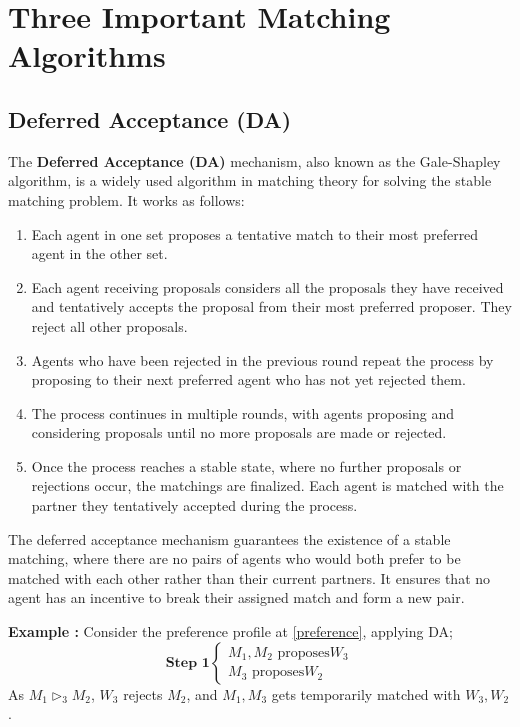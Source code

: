 \documentclass[a4paper,11pt,table]{article}
\newcommand{\rva}{\vartriangleright}
\theoremstyle{definition}
\theoremstyle{remark}
\begin{document}
\section{Three Important Matching Algorithms}

\subsection{Deferred Acceptance (DA)}

   The \textbf{Deferred Acceptance (DA)} mechanism, also known as the Gale-Shapley algorithm, is a widely used algorithm in matching theory for solving the stable matching problem. It works as follows:
    \begin{enumerate}
        \item Each agent in one set proposes a tentative match to their most preferred agent in the other set.
        \item Each agent receiving proposals considers all the proposals they have received and tentatively accepts the proposal from their most preferred proposer. They reject all other proposals.
        \item Agents who have been rejected in the previous round repeat the process by proposing to their next preferred agent who has not yet rejected them.
        \item The process continues in multiple rounds, with agents proposing and considering proposals until no more proposals are made or rejected.
        \item Once the process reaches a stable state, where no further proposals or rejections occur, the matchings are finalized. Each agent is matched with the partner they tentatively accepted during the process.
    \end{enumerate}
    The deferred acceptance mechanism guarantees the existence of a stable matching, where there are no pairs of agents who would both prefer to be matched with each other rather than their current partners. It ensures that no agent has an incentive to break their assigned match and form a new pair.

\textbf{Example :} Consider the preference profile at \ref{preference}, applying DA;
$$
\textbf{Step 1}
\begin{cases}
{M_1, M_2} \text{ proposes} W_3 \\
{M_3} \text{ proposes} W_2
\end{cases}
$$
As $M_1 \rva_3 M_2$, $W_3$ rejects $M_2$, and {$M_1, M_3$} gets temporarily matched with {$W_3, W_2$}.
\end{document}
